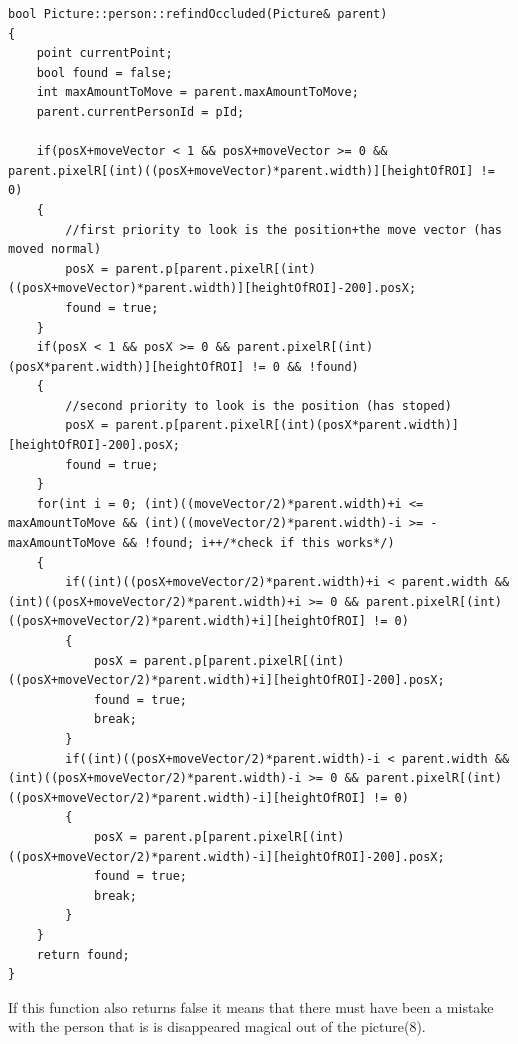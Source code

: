 \begin{lstlisting}
bool Picture::person::refindOccluded(Picture& parent)
{
	point currentPoint;
	bool found = false;
	int maxAmountToMove = parent.maxAmountToMove;
	parent.currentPersonId = pId;

	if(posX+moveVector < 1 && posX+moveVector >= 0 && parent.pixelR[(int)((posX+moveVector)*parent.width)][heightOfROI] != 0)
	{
		//first priority to look is the position+the move vector (has moved normal)
		posX = parent.p[parent.pixelR[(int)((posX+moveVector)*parent.width)][heightOfROI]-200].posX;
		found = true;
	} 
	if(posX < 1 && posX >= 0 && parent.pixelR[(int)(posX*parent.width)][heightOfROI] != 0 && !found)
	{
		//second priority to look is the position (has stoped)
		posX = parent.p[parent.pixelR[(int)(posX*parent.width)][heightOfROI]-200].posX;
		found = true;
	} 
	for(int i = 0; (int)((moveVector/2)*parent.width)+i <= maxAmountToMove && (int)((moveVector/2)*parent.width)-i >= -maxAmountToMove && !found; i++/*check if this works*/)
	{
		if((int)((posX+moveVector/2)*parent.width)+i < parent.width && (int)((posX+moveVector/2)*parent.width)+i >= 0 && parent.pixelR[(int)((posX+moveVector/2)*parent.width)+i][heightOfROI] != 0)
		{
			posX = parent.p[parent.pixelR[(int)((posX+moveVector/2)*parent.width)+i][heightOfROI]-200].posX;
			found = true;
			break;
		}
		if((int)((posX+moveVector/2)*parent.width)-i < parent.width && (int)((posX+moveVector/2)*parent.width)-i >= 0 && parent.pixelR[(int)((posX+moveVector/2)*parent.width)-i][heightOfROI] != 0)
		{
			posX = parent.p[parent.pixelR[(int)((posX+moveVector/2)*parent.width)-i][heightOfROI]-200].posX;
			found = true;
			break;
		}
	}
	return found;
}
\end{lstlisting}
If this function also returns false it means that there must have been a mistake with the person that is is disappeared magical out of the picture(8).

